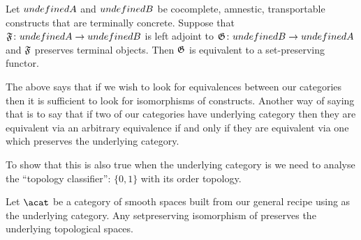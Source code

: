 \documentclass[%
a4paper,%
arxiv,%
defaults
]{myclass}
\begin{document}
\begin{proposition}
Let \(\m{A}\) and \(\m{B}\) be cocomplete, amnestic, transportable constructs that are terminally concrete.
Suppose that \(\func{F} \colon \m{A} \to \m{B}\) is left adjoint to \(\func{G} \colon \m{B} \to \m{A}\) and \(\func{F}\) preserves terminal objects.
Then \(\func{G}\) is equivalent to a set\hyp{}preserving functor. \noproof
\end{proposition}

The above says that if we wish to look for equivalences between our categories then it is sufficient to look for isomorphisms of constructs.
Another way of saying that is to say that if two of our categories have underlying category \xcat then they are equivalent via an arbitrary equivalence if and only if they are equivalent via one which preserves the underlying category.

To show that this is also true when the underlying category is \ycat we need to analyse the ``topology classifier'': \(\{0, 1\}\) with its order topology.


\begin{proposition}
Let \(\acat\) be a category of smooth spaces built from our general recipe using \ycat as the underlying category.
Any set\enhyp{}preserving isomorphism of \acat preserves the underlying topological spaces.
\end{proposition}
\end{document}
